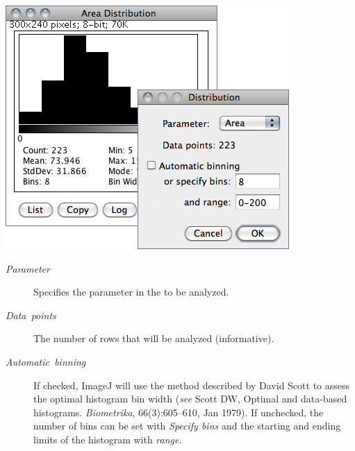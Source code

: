 \begin{minipage}[c][1\totalheight][t]{0.555\columnwidth}%
\includegraphics[scale=0.55]{images/Distribution}%
\end{minipage}%
\begin{minipage}[c][1\totalheight][t]{0.445\columnwidth}%
\begin{description}
\item [{\emph{Parameter}}] Specifies the parameter in the 
to be analyzed.
\item [{\emph{Data\ points}}] The number of rows that will be analyzed
(informative).
\item [{\emph{Automatic\ binning}}] If checked, ImageJ will use the method
described by David Scott to assess the optimal histogram bin width
(\emph{see} Scott DW, Optimal and data-based histograms. \emph{Biometrika},
66(3):605--610, Jan 1979). If unchecked, the number of bins can be
set with \emph{Specify bins }and the starting and ending limits of
the histogram with \emph{range}.\end{description}
%
\end{minipage}




\subsection{\protect{}\label{sub:Label}}

